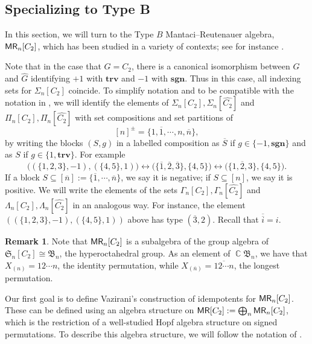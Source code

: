 \documentclass[11pt, oneside, reqno]{amsart}
\theoremstyle{definition}
\newtheorem{remark}[theorem]{Remark}
\numberwithin{equation}{section}
\DeclareMathOperator{\C}{\mathbb{C}}
\def \MR {{\sf{MR}}}
\def \ol{\overline}
\def \sym{\mathfrak{S}}
\def \wh{\widehat}
\def \ztwo {{C_2}}
\def \ztwodual {{\widehat{\ztwo}}}
\def \ztwosetcomposition{{\Sigma_n[\ztwo]}}
\def \ztwosetpartition{{\Pi_n[\ztwo]}}
\def \ztwocomposition{{\Gamma_n[\ztwo]}}
\def \ztwopartition{{\Lambda_n[\ztwo]}}
\def \ztwosetcompositiondual{{\Sigma_n[\ztwodual]}}
\def \ztwosetpartitiondual{{\Pi_n[\ztwodual]}}
\def \ztwocompositiondual{{\Gamma_n[\ztwodual]}}
\def \ztwopartitiondual{{\Lambda_n[\ztwodual]}}
\def \sgn{\mathbf{sgn}}
\def \trv{\mathbf{trv}}
\begin{document}
\subsection{Specializing to Type B }\label{sec:definingvazidem} \label{s:typeBMR}
In this section, we will turn to the Type $B$ Mantaci--Reutenauer algebra, $\MR_n[\ztwo]$, which has been studied in a variety of contexts; see for instance \cite{abn04peak, brauner2023type, DouTom2018decomposition, pang2021eigenvalues, vazirani}. 

Note that in the case that $G = \ztwo$, there is a canonical isomorphism
between $G$ and $\wh{G}$ identifying $+1$ with $\trv$ and $-1$ with $\sgn$.
Thus in this case, all indexing sets for $\Sigma_n[\ztwo]$ coincide. To
simplify notation and to be compatible with the notation in \cite{vazirani},
we will identify the elements of $\ztwosetcomposition, \ztwosetcompositiondual$ and
$\ztwosetpartition, \ztwosetpartitiondual$ with set compositions and set partitions of
\[ [n]^{\pm}= \{ 1, \ol{1}, \cdots, n, \ol{n} \},\]
by writing the blocks $(S, g)$ in a labelled composition as $\ol{S}$ if $g
\in \{-1, \sgn\}$ and as $S$ if $g \in \{1, \trv\}$. For example
\[
    \big((\{1,2,3 \}, -1), (\{4,5 \}, 1)\big)
    \longleftrightarrow
    \big({\{\ol{1},\ol{2},\ol{3} \}}, \{ 4, 5 \}\big)
    \longleftrightarrow
    \big(\ol{\{1,2,3 \}}, \{ 4, 5 \}\big).
\]
If a block $S \subseteq [\ol{n}]:= \{ \ol{1}, \cdots, \ol{n} \}$, we say it is negative; if $S \subseteq [n]$, we say it is positive. 
We will write the elements of the sets $\ztwocomposition, \ztwocompositiondual$ and $\ztwopartition, \ztwopartitiondual$ in an analogous way. For instance, the element $((\{1,2,3 \}, -1), (\{4,5 \}, 1))$ above has type $(\ol{3},2)$. Recall that $\ol{\ol{i}} = i$. 

\begin{remark}
Note that $\MR_n[\ztwo]$ is a subalgebra of the group algebra of $\sym_n[\ztwo] \cong \mathfrak{B}_n$, the hyperoctahedral group. As an element of $\C \mathfrak{B}_n$, we have that $X_{(n)} = 12\cdots n$, the identity permutation, while $X_{(\ol{n})} = \ol{12\cdots n}$, the longest permutation.
\end{remark}

Our first goal is to define Vazirani's construction of idempotents for $\MR_n[\ztwo]$. These can be defined using an algebra structure on $\MR[\ztwo] := \bigoplus_n \MR_n[\ztwo]$, which is the restriction of a well-studied Hopf algebra structure on signed permutations. To describe this algebra structure, we will follow the notation of \cite{abn04peak}. 
\end{document}
